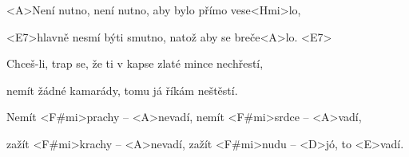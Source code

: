 

\zr
<A>Není nutno, není nutno, aby bylo přímo vese<Hmi>lo,

<E7>hlavně nesmí býti smutno, natož aby se breče<A>lo. <E7>
\kr

\zs
Chceš-li, trap se, že ti v kapse zlaté mince nechřestí,

nemít žádné kamarády, tomu já říkám neštěstí.
\ks

\zs
Nemít <F#mi>prachy -- <A>nevadí, nemít <F#mi>srdce -- <A>vadí,

zažít <F#mi>krachy -- <A>nevadí, zažít <F#mi>nudu -- <D>jó, to <E>vadí.
\ks


\zr \kr

\zr \kr

\kp
